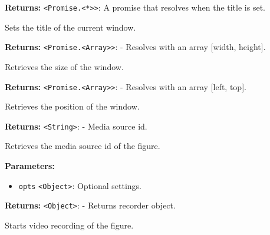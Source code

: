 \documentclass[12pt,a4paper]{article}
\begin{document}
\noindent \textbf{Returns:} \texttt{<Promise.<*>>}: A promise that resolves when the title is set.

\noindent Sets the title of the current window.

\vspace{5mm}
\noindent {}


\noindent \textbf{Returns:} \texttt{<Promise.<Array>>}: - Resolves with an array [width, height].

\noindent Retrieves the size of the window.

\vspace{5mm}
\noindent {}


\noindent \textbf{Returns:} \texttt{<Promise.<Array>>}: - Resolves with an array [left, top].

\noindent Retrieves the position of the window.

\vspace{5mm}
\noindent {}


\noindent \textbf{Returns:} \texttt{<String>}: - Media source id.

\noindent Retrieves the media source id of the figure.

\vspace{5mm}
\noindent {}


\noindent \textbf{Parameters:}
\begin{itemize}
  \item \texttt{opts} \texttt{<Object>}: Optional settings.
\end{itemize}

\noindent \textbf{Returns:} \texttt{<Object>}: - Returns recorder object.

\noindent Starts video recording of the figure.

\vspace{5mm}
\noindent {}
\end{document}
